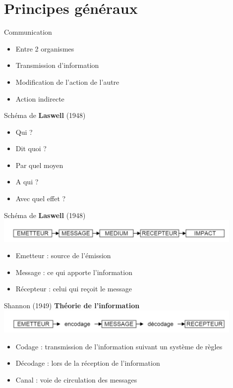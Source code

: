 \section{Principes généraux}

\begin{frame}
	\begin{block}{Communication}
		\begin{itemize}
			\item{Entre 2 organismes}
			\item{Transmission d'information}
			\item{Modification de l'action de l'autre}
			\item{Action indirecte}
		\end{itemize}
	\end{block}
\end{frame}

\begin{frame}
	\begin{block}{Schéma de \textbf{Laswell} (1948)}
		\begin{itemize}
			\item{Qui ?}
			\item{Dit quoi ?}
			\item{Par quel moyen}
			\item{A qui ?}
			\item{Avec quel effet ?}
		\end{itemize}
	\end{block} \pause

	\begin{block}{Schéma de \textbf{Laswell} (1948)}
		\includegraphics[width=12cm]{laswell.png}
		\begin{itemize}
			\item{Emetteur : source de l'émission}
			\item{Message : ce qui apporte l'information}
			\item{Récepteur : celui qui reçoit le message}
		\end{itemize}
	\end{block}
\end{frame}

\begin{frame}
	\begin{block}{Shannon (1949)}
		\textbf{Théorie de l'information} 
		\includegraphics[width=12cm]{shannon.png}
		\begin{itemize}
			\item{Codage : transmission de l'information suivant un système de règles}
			\item{Décodage : lors de la réception de l'information}
			\item{Canal : voie de circulation des messages}
		\end{itemize}
	\end{block}
\end{frame}

